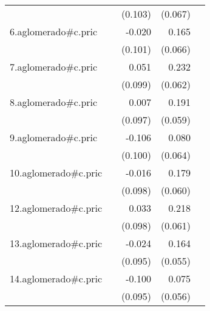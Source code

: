 {\begin{longtable}{l*{4}{D{.}{.}{-1}}}
            &                     &     (0.103)         &     (0.067)         &                     \\
\addlinespace
6.aglomerado#c.pric&                     &      -0.020         &       0.165\sym{*}  &                     \\
            &                     &     (0.101)         &     (0.066)         &                     \\
\addlinespace
7.aglomerado#c.pric&                     &       0.051         &       0.232\sym{***}&                     \\
            &                     &     (0.099)         &     (0.062)         &                     \\
\addlinespace
8.aglomerado#c.pric&                     &       0.007         &       0.191\sym{**} &                     \\
            &                     &     (0.097)         &     (0.059)         &                     \\
\addlinespace
9.aglomerado#c.pric&                     &      -0.106         &       0.080         &                     \\
            &                     &     (0.100)         &     (0.064)         &                     \\
\addlinespace
10.aglomerado#c.pric&                     &      -0.016         &       0.179\sym{**} &                     \\
            &                     &     (0.098)         &     (0.060)         &                     \\
\addlinespace
12.aglomerado#c.pric&                     &       0.033         &       0.218\sym{***}&                     \\
            &                     &     (0.098)         &     (0.061)         &                     \\
\addlinespace
13.aglomerado#c.pric&                     &      -0.024         &       0.164\sym{**} &                     \\
            &                     &     (0.095)         &     (0.055)         &                     \\
\addlinespace
14.aglomerado#c.pric&                     &      -0.100         &       0.075         &                     \\
            &                     &     (0.095)         &     (0.056)         &                     \\

\end{longtable}}
